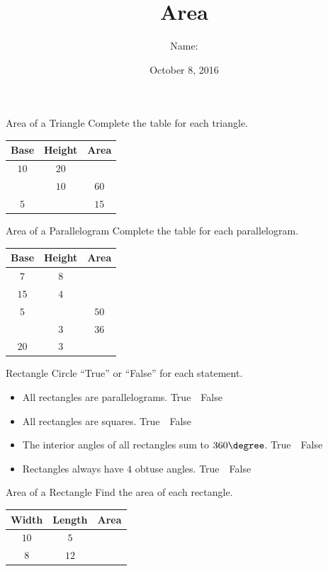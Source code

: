 \documentclass[14pt,letterpaper]{article}
\title{Area}
\author{Name: \underline{\hspace{5cm}}}
\date{October 8, 2016}
\begin{document}
\HomeworkTitle

\thispagestyle{empty}

\begin{problem}{Area of a Triangle}
 Complete the table for each triangle.

 \begin{center}
 \begin{tabular}{|c|c|c|}
  \hline
  Base & Height & Area \\
  \hline
  $10$ & $20$ & \\
  & $10$ & $60$ \\
  $5$ & & $15$ \\
  \hline
 \end{tabular}
 \end{center}
\end{problem}

\begin{problem}{Area of a Parallelogram}
 Complete the table for each parallelogram.

 \begin{center}
 \begin{tabular}{|c|c|c|}
  \hline
  Base & Height & Area \\
  \hline
  $7$ & $8$ & \\
  $15$ & $4$ & \\
  $5$ & & $50$ \\
  & $3$ & $36$ \\
  $20$ & $3$ & \\
  \hline
 \end{tabular}
 \end{center}
\end{problem}

\begin{problem}{Rectangle}
 Circle ``True'' or ``False'' for each statement.
 \begin{itemize}
  \item All rectangles are parallelograms. \hfill True~~False
  \item All rectangles are squares. \hfill True~~False
  \item The interior angles of all rectangles sum to $360\degree$.
  \hfill True~~False
  \item Rectangles always have $4$ obtuse angles. \hfill True~~False
 \end{itemize}
\end{problem}

\begin{problem}{Area of a Rectangle}
 Find the area of each rectangle.

 \begin{center}
  \begin{tabular}{|c|c|c|}
   \hline
   Width & Length & Area \\
   \hline
   $10$ & $5$ & \\
   $8$ & $12$ & \\
   \hline
  \end{tabular}
 \end{center}
\end{problem}
\end{document}

